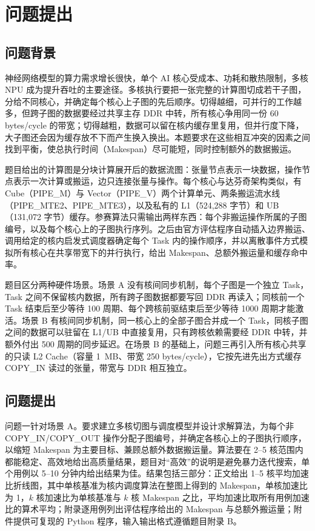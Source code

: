 \section{问题提出}

\subsection{问题背景}

神经网络模型的算力需求增长很快，单个 AI 核心受成本、功耗和散热限制，多核 NPU 成为提升吞吐的主要途径。多核执行要把一张完整的计算图切成若干子图，分给不同核心，并确定每个核心上子图的先后顺序。切得越细，可并行的工作越多，但跨子图的数据要经过共享主存 DDR 中转，所有核心争用同一份 60 bytes/cycle 的带宽；切得越粗，数据可以留在核内缓存里复用，但并行度下降，大子图还会因为缓存放不下而产生换入换出。本题要求在这些相互冲突的因素之间找到平衡，使总执行时间（Makespan）尽可能短，同时控制额外的数据搬运。

题目给出的计算图是分块计算展开后的数据流图：张量节点表示一块数据，操作节点表示一次计算或搬运，边只连接张量与操作。每个核心与达芬奇架构\cite{liao2019davinci}类似，有 Cube（PIPE\_M）与 Vector（PIPE\_V）两个计算单元、两条搬运流水线（PIPE\_MTE2、PIPE\_MTE3），以及私有的 L1（524{,}288 字节）和 UB（131{,}072 字节）缓存。参赛算法只需输出两样东西：每个非搬运操作所属的子图编号，以及每个核心上的子图执行序列。之后由官方评估程序自动插入边界搬运、调用给定的核内启发式调度器确定每个 Task 内的操作顺序，并以离散事件方式模拟所有核心在共享带宽下的并行执行，给出 Makespan、总额外搬运量和缓存命中率。

题目区分两种硬件场景。场景 A 没有核间同步机制，每个子图是一个独立 Task，Task 之间不保留核内数据，所有跨子图数据都要写回 DDR 再读入；同核前一个 Task 结束后至少等待 100 周期、每个跨核前驱结束后至少等待 1000 周期才能激活。场景 B 有核间同步机制，同一核心上的全部子图合并成一个 Task，同核子图之间的数据可以驻留在 L1/UB 中直接复用，只有跨核依赖需要经 DDR 中转，并额外付出 500 周期的同步延迟。在场景 B 的基础上，问题三再引入所有核心共享的只读 L2 Cache（容量 1~MB、带宽 250 bytes/cycle），它按先进先出方式缓存 COPY\_IN 读过的张量，带宽与 DDR 相互独立。

\subsection{问题提出}

问题一针对场景 A。要求建立多核切图与调度模型并设计求解算法，为每个非 COPY\_IN/COPY\_OUT 操作分配子图编号，并确定各核心上的子图执行顺序，以缩短 Makespan 为主要目标、兼顾总额外数据搬运量。算法要在 2--5 核范围内都能稳定、高效地给出高质量结果，题目对“高效”的说明是避免暴力迭代搜索，单个用例以 5--10 分钟内给出结果为佳。结果包括三部分：正文给出 1--5 核平均加速比折线图，其中单核基准为核内调度算法在整图上得到的 Makespan，单核加速比为 1，$k$ 核加速比为单核基准与 $k$ 核 Makespan 之比，平均加速比取所有用例加速比的算术平均；附录逐用例列出评估程序给出的 Makespan 与总额外搬运量；附件提供可复现的 Python 程序，输入输出格式遵循题目附录 B。


